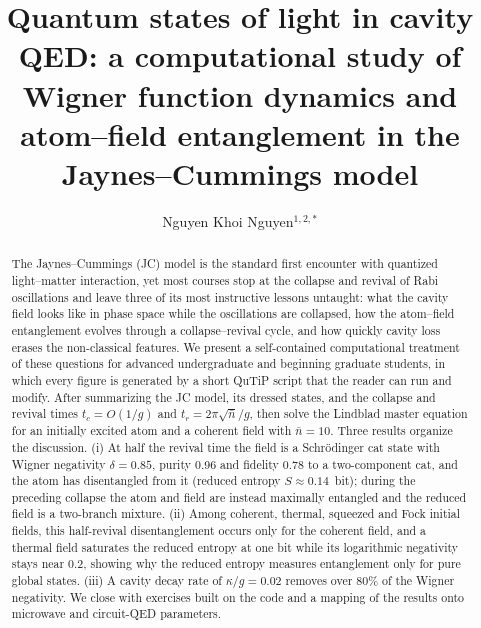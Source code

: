 \documentclass{iopjournal}
\begin{document}

\title{Quantum states of light in cavity QED: a computational study of Wigner function dynamics and atom--field entanglement in the Jaynes--Cummings model}

\author{Nguyen Khoi Nguyen$^{1,2,*}$}






\begin{abstract}
The Jaynes--Cummings (JC) model is the standard first encounter with quantized light--matter interaction, yet most courses stop at the collapse and revival of Rabi oscillations and leave three of its most instructive lessons untaught: what the cavity field looks like in phase space while the oscillations are collapsed, how the atom--field entanglement evolves through a collapse--revival cycle, and how quickly cavity loss erases the non-classical features. We present a self-contained computational treatment of these questions for advanced undergraduate and beginning graduate students, in which every figure is generated by a short QuTiP script that the reader can run and modify. After summarizing the JC model, its dressed states, and the collapse and revival times $t_c = O(1/g)$ and $t_r = 2\pi\sqrt{\bar{n}}/g$, then solve the Lindblad master equation for an initially excited atom and a coherent field with $\bar{n} = 10$. Three results organize the discussion. (i) At half the revival time the field is a Schr\"{o}dinger cat state with Wigner negativity $\delta = 0.85$, purity 0.96 and fidelity 0.78 to a two-component cat, and the atom has disentangled from it (reduced entropy $S \approx 0.14$~bit); during the preceding collapse the atom and field are instead maximally entangled and the reduced field is a two-branch mixture. (ii) Among coherent, thermal, squeezed and Fock initial fields, this half-revival disentanglement occurs only for the coherent field, and a thermal field saturates the reduced entropy at one bit while its logarithmic negativity stays near 0.2, showing why the reduced entropy measures entanglement only for pure global states. (iii) A cavity decay rate of $\kappa/g = 0.02$ removes over 80\% of the Wigner negativity. We close with exercises built on the code and a mapping of the results onto microwave and circuit-QED parameters.
\end{abstract}
\end{document}
